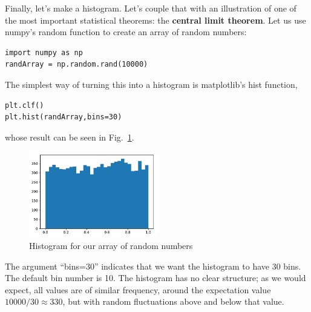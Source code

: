\documentclass[twocolumn,apj]{openjournal}
\begin{document}
Finally, let's make a histogram. Let's couple that with an illustration of one of the most important statistical theorems: the {\bf central limit theorem}. Let us use numpy's random function to create an array of random numbers:
\begin{lstlisting}
import numpy as np
randArray = np.random.rand(10000)
\end{lstlisting}
The simplest way of turning this into a histogram is matplotlib's hist function,
\begin{lstlisting}
plt.clf()
plt.hist(randArray,bins=30)
\end{lstlisting}
whose result can be seen in Fig.~\ref{Histo1}.
\begin{figure}[htbp]
\begin{center}
\includegraphics[width=0.5\textwidth]{randomfield1.pdf}
\caption{Histogram for our array of random numbers}
\label{Histo1}
\end{center}
\end{figure}
The argument ``bins=30'' indicates that we want the histogram to have 30 bins. The default bin number is 10.
The histogram has no clear structure; as we would expect, all values are of similar frequency, around the expectation value $10000/30\approx 330$, but with random fluctuations above and below that value.
\end{document}
